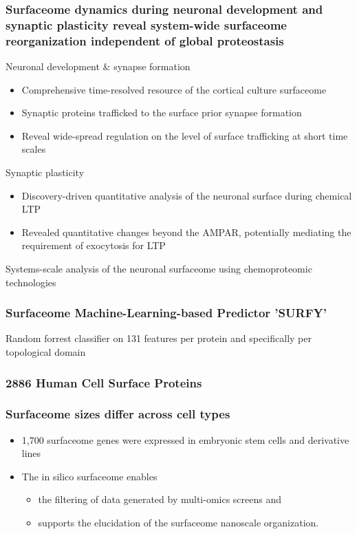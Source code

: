 \begin{itemize}
\begin{itemize}
\subsubsection{Surfaceome dynamics during neuronal development and synaptic plasticity reveal system-wide surfaceome reorganization independent of global proteostasis}
Neuronal development & synapse formation
\begin{itemize}
    \item Comprehensive time-resolved resource of the cortical culture surfaceome
\item Synaptic proteins trafficked to the surface prior synapse formation
\item Reveal wide-spread regulation on the level of surface trafficking at short time scales
\end{itemize}

Synaptic plasticity
\begin{itemize}
    \item Discovery-driven quantitative analysis of the neuronal surface during chemical LTP
\item Revealed quantitative changes beyond the AMPAR, potentially mediating the requirement of
exocytosis for LTP
\end{itemize}
Systems-scale analysis of the neuronal  surfaceome using chemoproteomic technologies

\subsubsection{Surfaceome Machine-Learning-based Predictor 'SURFY'}
Random forrest classifier on 131 features per protein and specifically per topological domain

\subsubsection{2886 Human Cell Surface Proteins}

\subsubsection{Surfaceome sizes differ across cell types}
\begin{itemize}
    \item 1,700 surfaceome genes were expressed in embryonic stem cells and derivative lines
\item The in silico surfaceome enables
\begin{itemize}
    \item the filtering of data generated by multi-omics screens and
\item supports the elucidation of the surfaceome nanoscale organization.
\end{itemize}


\end{itemize}
\end{itemize}
\end{itemize}
